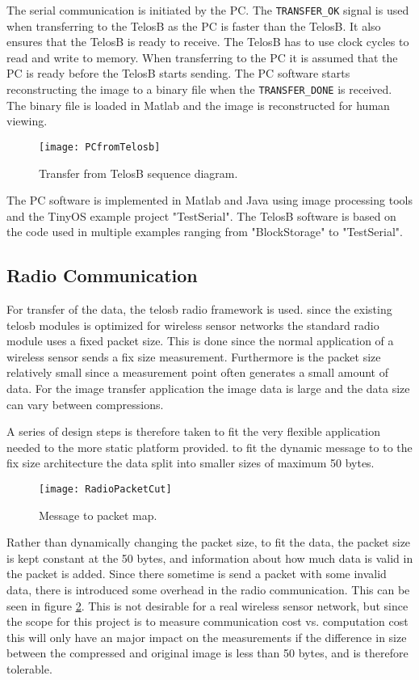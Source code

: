 The serial communication is initiated by the PC. 
The \texttt{TRANSFER\_OK} signal is used when transferring to the TelosB as the PC is faster than the TelosB. 
It also ensures that the TelosB is ready to receive. 
The TelosB has to use clock cycles to read and write to memory. 
When transferring to the PC it is assumed that the PC is ready before the TelosB starts sending. 
The PC software starts reconstructing the image to a binary file when the \texttt{TRANSFER\_DONE} is received. 
The binary file is loaded in Matlab and the image is reconstructed for human viewing.
\begin{figure}[H]
	\centering
	\texttt{[image: PCfromTelosb]}
	\caption{Transfer from TelosB sequence diagram.}
	\label{transferfromtelos}
\end{figure}
The PC software is implemented in Matlab and Java using image processing tools and the TinyOS example project "TestSerial". 
The TelosB software is based on the code used in multiple examples ranging from "BlockStorage" to "TestSerial". 


\subsection{Radio Communication}\label{sec:Radio-Block}

For transfer of the data, the telosb radio framework is used. since the existing telosb modules is optimized for wireless sensor networks the standard radio module uses a fixed packet size. This is done since the normal application of a wireless sensor sends a fix size measurement. Furthermore is the packet size relatively small since a measurement point often generates a small amount of data. For the image transfer application the image data is large and the data size can vary between compressions.

A series of design steps is therefore taken to fit the very flexible application needed to the more static platform provided. to fit the dynamic message to to the fix size architecture the data split into smaller sizes of maximum 50 bytes. 

\begin{figure}[H]
	\centering
	\texttt{[image: RadioPacketCut]}
	\caption{Message to packet map.}
	\label{fig:RadioPacketCut}
\end{figure}

Rather than dynamically changing the packet size, to fit the data, the packet size is kept constant at the 50 bytes, and information about how much data is valid in the packet is added. Since there sometime is send a packet with some invalid data, there is introduced some overhead in the radio communication. This can be seen in figure \ref{fig:RadioPacketCut}. This is not desirable for a real wireless sensor network, but since the scope for this project is to measure communication cost vs. computation cost this will only have an major impact on the measurements if the difference in size between the compressed and original image is less than 50 bytes, and is therefore tolerable.

